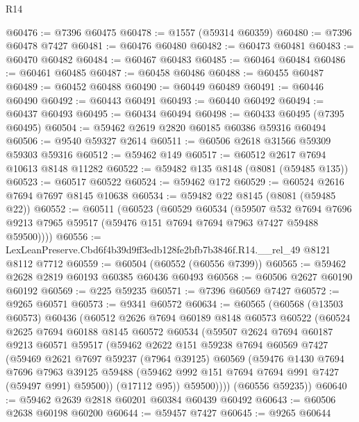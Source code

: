 \begin{lexlean}{R14}
\begin{coremodule}
@60476 := @7396 @60475
@60478 := @1557 (@59314 @60359)
@60480 := @7396 @60478 @7427
@60481 := @60476 @60480
@60482 := @60473 @60481
@60483 := @60470 @60482
@60484 := @60467 @60483
@60485 := @60464 @60484
@60486 := @60461 @60485
@60487 := @60458 @60486
@60488 := @60455 @60487
@60489 := @60452 @60488
@60490 := @60449 @60489
@60491 := @60446 @60490
@60492 := @60443 @60491
@60493 := @60440 @60492
@60494 := @60437 @60493
@60495 := @60434 @60494
@60498 := @60433 @60495 (@7395 @60495)
@60504 := @59462 @2619 @2820 @60185 @60386 @59316 @60494
@60506 := @9540 @59327 @2614
@60511 := @60506 @2618 @31566 @59309 @59303 @59316
@60512 := @59462 @149
@60517 := @60512 @2617 @7694 @10613 @8148 @11282
@60522 := @59482 @135 @8148 (@8081 (@59485 @135))
@60523 := @60517 @60522
@60524 := @59462 @172
@60529 := @60524 @2616 @7694 @7697 @8145 @10638
@60534 := @59482 @22 @8145 (@8081 (@59485 @22))
@60552 := @60511
    (@60523
      (@60529
        @60534
        (@59507
          @532
          @7694
          @7696
          @9213
          @7965
          @59517
          (@59476 @151 @7694 @7694 @7963 @7427 @59488 @59500))))
@60556 := LexLeanPreserve.Cbd6f4b39d9ff3edb128fe2bfb7b3846f.R14.__rel_49 @8121 @8112 @7712
@60559 := @60504 (@60552 (@60556 @7399))
@60565 := @59462 @2628 @2819 @60193 @60385 @60436 @60493
@60568 := @60506 @2627 @60190 @60192
@60569 := @225 @59235
@60571 := @7396 @60569 @7427
@60572 := @9265 @60571
@60573 := @9341 @60572
@60634 := @60565
    (@60568
      (@13503 @60573)
      @60436
      (@60512
        @2626
        @7694
        @60189
        @8148
        @60573
        @60522
        (@60524
          @2625
          @7694
          @60188
          @8145
          @60572
          @60534
          (@59507
            @2624
            @7694
            @60187
            @9213
            @60571
            @59517
            (@59462
              @2622
              @151
              @59238
              @7694
              @60569
              @7427
              (@59469
                @2621
                @7697
                @59237
                (@7964 @39125)
                @60569
                (@59476
                  @1430
                  @7694
                  @7696
                  @7963
                  @39125
                  @59488
                  (@59462 @992 @151 @7694 @7694 @991 @7427 (@59497 @991) @59500))
                (@17112 @95))
              @59500))))
      (@60556 @59235))
@60640 := @59462 @2639 @2818 @60201 @60384 @60439 @60492
@60643 := @60506 @2638 @60198 @60200
@60644 := @59457 @7427
@60645 := @9265 @60644

\end{coremodule}
\end{lexlean}
